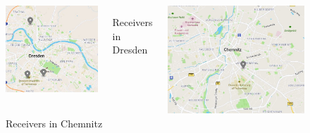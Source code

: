 \documentclass[aspectratio=169]{beamer}
\begin{document}
\begin{frame}
\begin{figure}
\begin{columns}
\begin{center}
\includegraphics[height=0.7\textheight]{figs/map_dresden.jpg}
\end{center}
\caption{Receivers in Dresden}
\raggedright
\begin{center}
\includegraphics[height=0.6\textheight]{figs/map_chemnitz.jpg}
\end{center}
\caption{Receivers in Chemnitz}

\end{columns}
\end{figure}

\end{frame}
\end{document}
